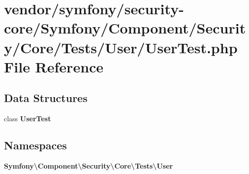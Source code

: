 \section{vendor/symfony/security-\/core/\+Symfony/\+Component/\+Security/\+Core/\+Tests/\+User/\+User\+Test.php File Reference}
\label{_user_test_8php}
\subsection*{Data Structures}
\begin{DoxyCompactItemize}
\item 
class {\bf User\+Test}
\end{DoxyCompactItemize}
\subsection*{Namespaces}
\begin{DoxyCompactItemize}
\item 
 {\bf Symfony\textbackslash{}\+Component\textbackslash{}\+Security\textbackslash{}\+Core\textbackslash{}\+Tests\textbackslash{}\+User}
\end{DoxyCompactItemize}
